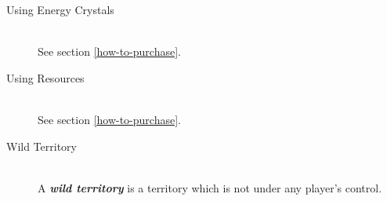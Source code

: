 \documentclass[a4paper]{article}
\begin{document}
\begin{description}
        \item[Using Energy Crystals] \hfill \\
            See section \ref{how-to-purchase}.
            
        \item[Using Resources] \hfill \\
            See section \ref{how-to-purchase}.
            
        \item[Wild Territory] \hfill \\
            A \textbf{\textit{wild territory}} is a territory
            which is not under any player's control.
    \end{description}
\end{document}
